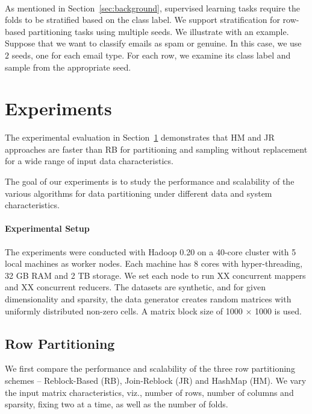 \documentclass{vldb}
\newcommand{\topic}[1]{\par \smallskip \smallskip \noindent{\bf \uline{#1}}}
\begin{document}
\topic{Supporting Stratification} \\
As mentioned in Section~\ref{sec:background}, supervised learning tasks require
the folds to be stratified based on the class label. We support
stratification for row-based partitioning tasks using multiple seeds. We
illustrate with an example. Suppose that we want to classify emails as spam or
genuine. In this case, we use $2$ seeds, one for each email type. For each row,
we examine its class label and sample from the appropriate seed.


\section{Experiments}
\label{sec:experiment}
The experimental evaluation in Section~\ref{sec:experiment} demonstrates that HM and JR approaches are faster
than RB for partitioning and sampling without replacement for a wide range of input data characteristics.

The goal of our experiments is to study the performance and scalability of the
various algorithms for data partitioning under different data and system characteristics.

\paragraph*{Experimental Setup}
The experiments were conducted with Hadoop 0.20 on a 40-core cluster with 5 local
machines as worker nodes. Each machine has 8 cores with hyper-threading, 32 GB RAM
and 2 TB storage. We set each node to run XX concurrent mappers and XX concurrent
reducers. The datasets are synthetic, and for given dimensionality
and sparsity, the data generator creates random matrices with
uniformly distributed non-zero cells. A matrix block size of 1000 $\times$ 1000 is used.

\subsection{Row Partitioning}
We first compare the performance and scalability of the three row partitioning
schemes -- Reblock-Based (RB), Join-Reblock (JR) and HashMap (HM). We vary the
input matrix characteristics, viz., number of rows, number of columns and sparsity,
fixing two at a time, as well as the number of folds.
\end{document}
